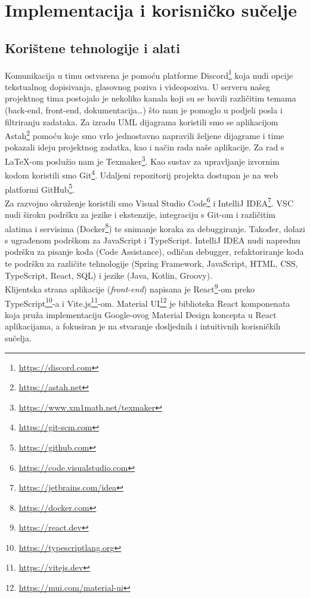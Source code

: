 \chapter{Implementacija i korisničko sučelje}
		
		
		\section{Korištene tehnologije i alati}
		
			Komunikacija u timu ostvarena je pomoću platforme Discord\footnote{\url{https://discord.com}} koja nudi opcije tekstualnog dopisivanja, glasovnog poziva i videopoziva. U serveru našeg projektnog tima postojalo je nekoliko kanala koji su se bavili različitim temama (back-end, front-end, dokumentacija…) što nam je pomoglo u podjeli posla i filtriranju zadataka. Za izradu UML dijagrama koristili smo se aplikacijom Astah\footnote{\url{https://astah.net}} pomoću koje smo vrlo jednostavno napravili željene dijagrame i time pokazali ideju projektnog zadatka, kao i način rada naše aplikacije. Za rad s LaTeX-om poslužio nam je Texmaker\footnote{\url{https://www.xm1math.net/texmaker}}. Kao sustav za upravljanje izvornim kodom koristili smo Git\footnote{\url{https://git-scm.com}}. Udaljeni repozitorij projekta dostupan je na web platformi GitHub\footnote{\url{https://github.com}}. \\
Za razvojno okruženje koristili smo Visual Studio Code\footnote{\url{https://code.visualstudio.com}} i IntelliJ IDEA\footnote{\url{https://jetbrains.com/idea}}. VSC nudi široku podršku za jezike i ekstenzije, integraciju s Git-om i različitim alatima i servisima (Docker\footnote{\url{https://docker.com}}) te snimanje koraka za debuggiranje. Također, dolazi s ugrađenom podrškom za JavaScript i TypeScript. IntelliJ IDEA nudi naprednu podršku za pisanje koda (Code Assistance), odličan debugger, refaktoriranje koda te podršku za različite tehnologije (Spring Framework, JavaScript, HTML, CSS, TypeScript, React, SQL) i jezike (Java, Kotlin, Groovy). \\
Klijentska strana aplikacije (\textit{front-end}) napisana je React\footnote{\url{https://react.dev}}-om preko TypeScript\footnote{\url{https://typescriptlang.org}}-a i Vite.js\footnote{\url{https://vitejs.dev}}-om. Material UI\footnote{\url{https://mui.com/material-ui}} je biblioteka React komponenata koja pruža implementaciju Google-ovog Material Design koncepta u React aplikacijama, a fokusiran je na stvaranje dosljednih i intuitivnih korisničkih sučelja.\\
